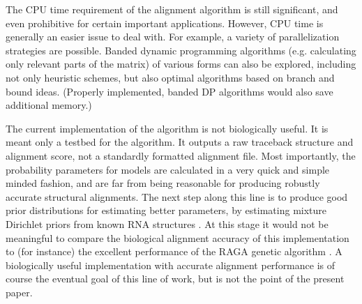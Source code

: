 \documentclass[11pt]{article}
\begin{document}
The CPU time requirement of the alignment algorithm is still
significant, and even prohibitive for certain important
applications. However, CPU time is generally an easier issue to deal
with. For example, a variety of parallelization strategies are
possible. Banded dynamic programming algorithms (e.g. calculating only
relevant parts of the matrix) of various forms can also be explored,
including not only heuristic schemes, but also optimal algorithms
based on branch and bound ideas. (Properly implemented, banded DP
algorithms would also save additional memory.)

The current implementation of the algorithm is not biologically
useful. It is meant only a testbed for the algorithm. It outputs a raw
traceback structure and alignment score, not a standardly formatted
alignment file. Most importantly, the probability parameters for
models are calculated in a very quick and simple minded fashion, and
are far from being reasonable for producing robustly accurate
structural alignments. The next step along this line is to produce
good prior distributions for estimating better parameters, by
estimating mixture Dirichlet priors from known RNA structures
\cite{Sjolander96}.  At this stage it would not be meaningful to
compare the biological alignment accuracy of this implementation to
(for instance) the excellent performance of the RAGA genetic algorithm
\cite{Notredame97}.  A biologically useful implementation with
accurate alignment performance is of course the eventual goal of this
line of work, but is not the point of the present paper.


\end{document}
